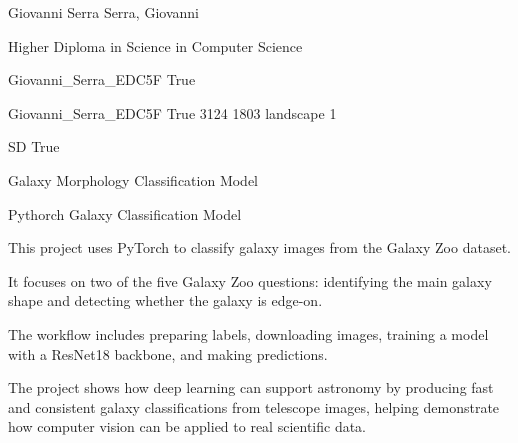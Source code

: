 
\begingroup{}\relax



\def\Key{Giovanni_Serra_EDC5F}

{Giovanni Serra}
{Serra, Giovanni}

{Higher Diploma in Science in Computer Science}

{Giovanni_Serra_EDC5F}
{True}

{Giovanni_Serra_EDC5F}
{True}
{3124}
{1803}
{landscape}
{1}

{SD}
{True}

{Galaxy Morphology Classification Model}

{Pythorch Galaxy Classification Model}

{This project uses PyTorch to classify galaxy images from the Galaxy Zoo dataset.

It focuses on two of the five Galaxy Zoo questions: identifying the main galaxy shape and detecting whether the galaxy is edge-on.

The workflow includes preparing labels, downloading images, training a model with a ResNet18 backbone, and making predictions.

The project shows how deep learning can support astronomy by producing fast and consistent galaxy classifications from telescope images, helping demonstrate how computer vision can be applied to real scientific data.}

